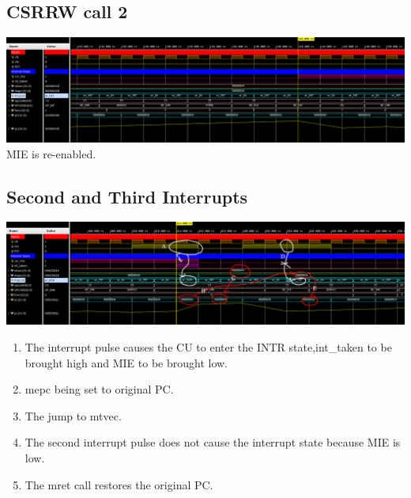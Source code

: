 \documentclass{article}
\begin{document}
\begin{landscape}
    \subsection*{CSRRW call 2}
    \includegraphics[width=\linewidth]{wf4.png}
    MIE is re-enabled.

    \subsection*{Second and Third Interrupts}
    \includegraphics[width=\linewidth]{wf5.png}
    \begin{enumerate}[label=\Alph*.]
        \item The interrupt pulse causes the CU to enter the INTR state,int\_taken to be brought high and MIE to be brought low.
        \item mepc being set to original PC.
        \item The jump to mtvec.
        \item The second interrupt pulse does not cause the interrupt state because MIE is low.
        \item The mret call restores the original PC.
    \end{enumerate}

\end{landscape}
\end{document}
